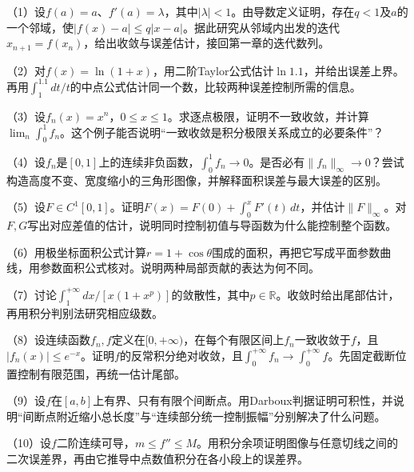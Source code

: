 \FloatBarrier
\newpage
\begin{exercise}[选做]
\mbox{}\par\nobreak

（1）设\(f(a)=a\)、\(f'(a)=\lambda\)，其中\(|\lambda|<1\)。由导数定义证明，存在\(q<1\)及\(a\)的一个邻域，使\(|f(x)-a|\le q|x-a|\)。据此研究从邻域内出发的迭代\(x_{n+1}=f(x_n)\)，给出收敛与误差估计，接回第一章的迭代数列。

（2）对\(f(x)=\ln(1+x)\)，用二阶Taylor公式估计\(\ln1.1\)，并给出误差上界。再用\(\int_1^{1.1}dt/t\)的中点公式估计同一个数，比较两种误差控制所需的信息。

（3）设\(f_n(x)=x^n\)，\(0\le x\le1\)。求逐点极限，证明不一致收敛，并计算\(\lim_n\int_0^1 f_n\)。这个例子能否说明“一致收敛是积分极限关系成立的必要条件”？

（4）设\(f_n\)是\([0,1]\)上的连续非负函数，\(\int_0^1f_n\to0\)。是否必有\(\|f_n\|_\infty\to0\)？尝试构造高度不变、宽度缩小的三角形图像，并解释面积误差与最大误差的区别。

（5）设\(F\in C^1[0,1]\)。证明\(F(x)=F(0)+\int_0^xF'(t)\,dt\)，并估计\(\|F\|_\infty\)。对\(F,G\)写出对应差值的估计，说明同时控制初值与导函数为什么能控制整个函数。

（6）用极坐标面积公式计算\(r=1+\cos\theta\)围成的面积，再把它写成平面参数曲线，用参数面积公式核对。说明两种局部贡献的表达为何不同。

（7）讨论\(\int_1^{+\infty}dx/[x(1+x^p)]\)的敛散性，其中\(p\in\mathbb R\)。收敛时给出尾部估计，再用积分判别法研究相应级数。

（8）设连续函数\(f_n,f\)定义在\([0,+\infty)\)，在每个有限区间上\(f_n\)一致收敛于\(f\)，且\(|f_n(x)|\le e^{-x}\)。证明\(f\)的反常积分绝对收敛，且\(\int_0^{+\infty}f_n\to\int_0^{+\infty}f\)。先固定截断位置控制有限范围，再统一估计尾部。

（9）设\(f\)在\([a,b]\)上有界、只有有限个间断点。用Darboux判据证明可积性，并说明“间断点附近缩小总长度”与“连续部分统一控制振幅”分别解决了什么问题。

（10）设\(f\)二阶连续可导，\(m\le f''\le M\)。用积分余项证明图像与任意切线之间的二次误差界，再由它推导中点数值积分在各小段上的误差界。
\end{exercise}
